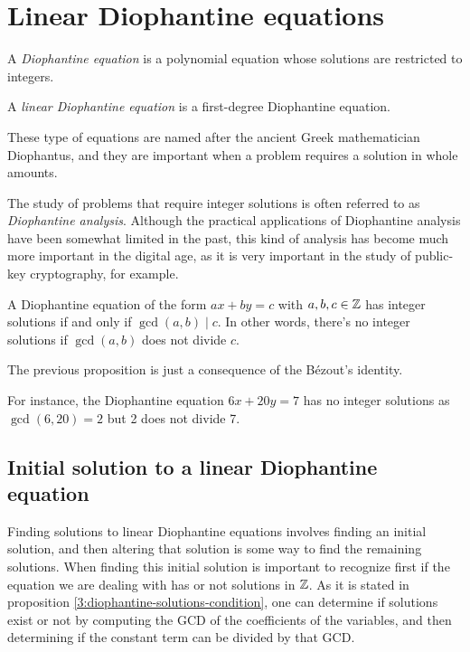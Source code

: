 \section{Linear Diophantine equations}
\begin{defi}
    A \textit{Diophantine equation} is a polynomial equation whose solutions
    are restricted to integers.
\end{defi}

\begin{defi}
    A \textit{linear Diophantine equation} is a first-degree
    Diophantine equation.
\end{defi}

    These type of equations are named after the ancient Greek mathematician Diophantus, and they are
    important when a problem requires a solution in whole amounts.

The study of problems that require integer solutions is often referred to as \textit{Diophantine analysis}.
Although the practical applications of Diophantine analysis have been somewhat limited in the past, this
kind of analysis has become much more important in the digital age, as it is very important in the study
of public-key cryptography, for example.

\begin{prop} \label{3:diophantine-solutions-condition}
    A Diophantine equation of the form $ax + by = c$ with $a, b, c\in\mathbb{Z}$ has integer solutions if and only
    if $\gcd\left( a, b \right) \mid c$. In other words, there's no integer solutions if $\gcd\left( a, b
    \right)$ does not divide $c$.
\end{prop}

\begin{remark}
    The previous proposition is just a consequence of the Bézout's identity.
\end{remark}

\begin{example}
    For instance, the Diophantine equation $6x + 20y = 7$ has no integer solutions as $\gcd\left( 6, 20
    \right) = 2$ but 2 does not divide 7.
\end{example}

\subsection{Initial solution to a linear Diophantine equation}
Finding solutions to linear Diophantine equations involves finding an initial solution, and then altering
that solution is some way to find the remaining solutions. When finding this initial solution is important
to recognize first if the equation we are dealing with has or not solutions in $\mathbb{Z}$. As it is stated in
proposition \ref{3:diophantine-solutions-condition}, one can determine if solutions exist or not by
computing the GCD of the coefficients of the variables, and then determining if the constant term can be
divided by that GCD.

